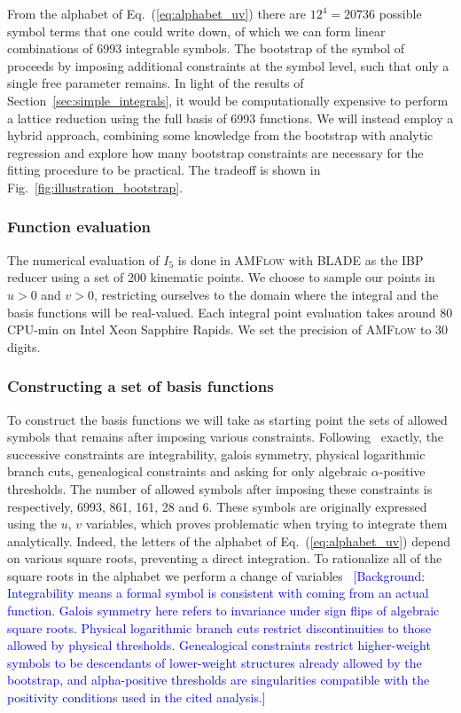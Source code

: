 \documentclass[a4paper,11pt]{article}
\begin{document}
From the alphabet of Eq.~(\ref{eq:alphabet_uv}) there are  $12^4=20736$ possible symbol terms that one could write down, of which we can form linear combinations of 6993 integrable symbols. The bootstrap of the symbol of \cite{Hannesdottir:2024hke} proceeds by imposing additional constraints at the symbol level, such that only a single free parameter remains. In light of the results of Section~\ref{sec:simple_integrals}, it would be computationally expensive to perform a lattice reduction using the full basis of 6993 functions. We will instead employ a hybrid approach, combining some knowledge from the bootstrap with analytic regression and explore how many bootstrap constraints are necessary for the fitting procedure to be practical. The tradeoff is shown in Fig.~\ref{fig:illustration_bootstrap}.

\subsubsection{Function evaluation}
The numerical evaluation of $I_5$ is done in \textsc{AMFlow} with \textsc{BLADE} as the IBP reducer using a set of 200 kinematic points. We choose to sample our points in $u>0$ and $v>0$, restricting ourselves to the domain where the integral and the basis functions will be real-valued. Each integral point evaluation takes around 80 CPU-min on Intel Xeon Sapphire Rapids. We set the precision of \textsc{AMFlow} to 30 digits. 

\subsubsection{Constructing a set of basis functions}
To construct the basis functions we will take as starting point the sets of allowed symbols that remains after imposing various constraints. Following~\cite{Hannesdottir:2024hke} exactly, the successive constraints 
are integrability, galois symmetry, physical logarithmic branch cuts, genealogical constraints and asking for only algebraic $\alpha$-positive thresholds. The number of allowed symbols after imposing these constraints is respectively,  6993, 861, 161, 28 and 6. These symbols are originally expressed using the $u$, $v$ variables, which proves problematic when trying to integrate them analytically. Indeed, the letters of the alphabet of Eq.~(\ref{eq:alphabet_uv}) depend on various square roots, preventing a direct integration. To rationalize all of the square roots in the alphabet we perform a change of variables~\cite{Caron-Huot:2014lda}
\textcolor{blue}{\small [Background: Integrability means a formal symbol is consistent with coming from an actual function. Galois symmetry here refers to invariance under sign flips of algebraic square roots. Physical logarithmic branch cuts restrict discontinuities to those allowed by physical thresholds. Genealogical constraints restrict higher-weight symbols to be descendants of lower-weight structures already allowed by the bootstrap, and alpha-positive thresholds are singularities compatible with the positivity conditions used in the cited analysis.]}
\end{document}
